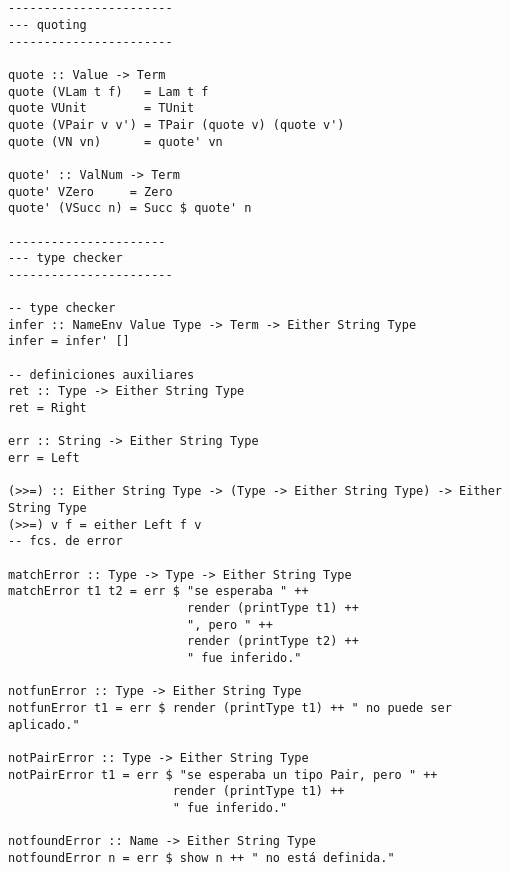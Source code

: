 \documentclass[a4paper]{article}
\begin{document}
\pagebreak
\begin{lstlisting}


-----------------------
--- quoting
-----------------------

quote :: Value -> Term
quote (VLam t f)   = Lam t f
quote VUnit        = TUnit
quote (VPair v v') = TPair (quote v) (quote v')
quote (VN vn)      = quote' vn

quote' :: ValNum -> Term
quote' VZero     = Zero
quote' (VSucc n) = Succ $ quote' n

----------------------
--- type checker
-----------------------

-- type checker
infer :: NameEnv Value Type -> Term -> Either String Type
infer = infer' []

-- definiciones auxiliares
ret :: Type -> Either String Type
ret = Right

err :: String -> Either String Type
err = Left

(>>=) :: Either String Type -> (Type -> Either String Type) -> Either String Type
(>>=) v f = either Left f v
-- fcs. de error

matchError :: Type -> Type -> Either String Type
matchError t1 t2 = err $ "se esperaba " ++
                         render (printType t1) ++
                         ", pero " ++
                         render (printType t2) ++
                         " fue inferido."

notfunError :: Type -> Either String Type
notfunError t1 = err $ render (printType t1) ++ " no puede ser aplicado."

notPairError :: Type -> Either String Type
notPairError t1 = err $ "se esperaba un tipo Pair, pero " ++
                       render (printType t1) ++
                       " fue inferido."

notfoundError :: Name -> Either String Type
notfoundError n = err $ show n ++ " no está definida."

\end{lstlisting}
\pagebreak
\end{document}
